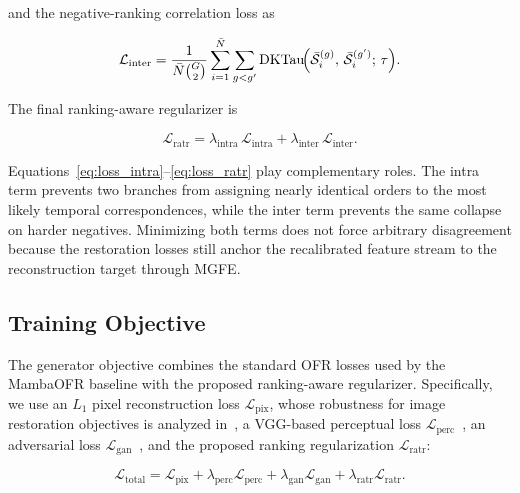 \documentclass[symmetry,article,submit,pdftex,moreauthors]{Definitions/mdpi}
\begin{document}
and the negative-ranking correlation loss as

\begin{equation}
\mathcal{L}_{\text{inter}} =
\frac{1}{\bar{N} \binom{G}{2}}
\sum_{i=1}^{\bar{N}}
\sum_{g < g'}
\mathrm{DKTau}\!\Bigl(
\bar{\mathcal{S}}_i^{(g)},\,
\bar{\mathcal{S}}_i^{(g')};\,
\tau
\Bigr).
\end{equation}

The final ranking-aware regularizer is

\begin{equation}
\mathcal{L}_{\text{ratr}} =
\lambda_{\text{intra}}\,\mathcal{L}_{\text{intra}}
+ \lambda_{\text{inter}}\,\mathcal{L}_{\text{inter}}.
\label{eq:loss_ratr}
\end{equation}

Equations~\eqref{eq:loss_intra}--\eqref{eq:loss_ratr} play complementary roles. The intra term prevents two branches from assigning nearly identical orders to the most likely temporal correspondences, while the inter term prevents the same collapse on harder negatives. Minimizing both terms does not force arbitrary disagreement because the restoration losses still anchor the recalibrated feature stream to the reconstruction target through MGFE.

\subsection{Training Objective}
\label{subsec:training_objective}

The generator objective combines the standard OFR losses used by the MambaOFR baseline with the proposed ranking-aware regularizer. Specifically, we use an $L_1$ pixel reconstruction loss $\mathcal{L}_{\mathrm{pix}}$, whose robustness for image restoration objectives is analyzed in~\cite{zhao2017loss_restoration}, a VGG-based perceptual loss $\mathcal{L}_{\mathrm{perc}}$~\cite{johnson2016perceptual}, an adversarial loss $\mathcal{L}_{\mathrm{gan}}$~\cite{goodfellow2014gan}, and the proposed ranking regularization $\mathcal{L}_{\mathrm{ratr}}$:

\begin{equation}
\mathcal{L}_{\mathrm{total}} =
\mathcal{L}_{\mathrm{pix}}
+ \lambda_{\mathrm{perc}}\mathcal{L}_{\mathrm{perc}}
+ \lambda_{\mathrm{gan}}\mathcal{L}_{\mathrm{gan}}
+ \lambda_{\mathrm{ratr}}\mathcal{L}_{\mathrm{ratr}}.
\label{eq:loss_total}
\end{equation}
\end{document}
